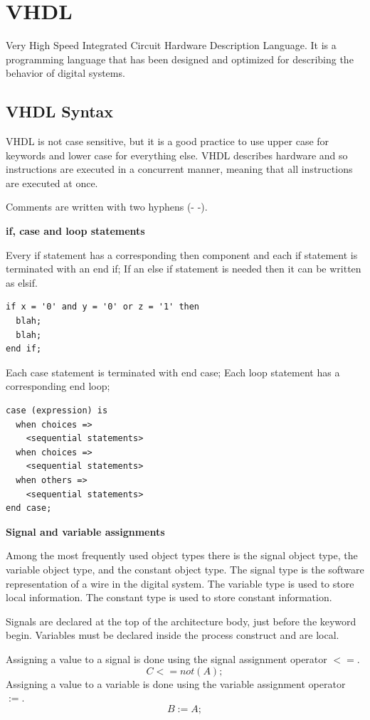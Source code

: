 \section{VHDL}
Very High Speed Integrated Circuit Hardware Description Language.
It is a programming language that has been designed and optimized for describing
the behavior of digital systems.

\subsection{VHDL Syntax}

VHDL is not case sensitive, but it is a good practice to use upper case for keywords and lower case for everything else.
VHDL describes hardware and so instructions are executed in a concurrent manner, meaning that all instructions are executed at once.


Comments are written with two hyphens (- -).


\textbf{if, case and loop statements}

Every if statement has a corresponding then component and each if statement is terminated with an end if;
If an else if statement is needed then it can be written as elsif.
\begin{verbatim}
if x = '0' and y = '0' or z = '1' then
  blah;
  blah;
end if;
\end{verbatim}

Each case statement is terminated with end case; Each loop statement has a corresponding end loop;

\begin{verbatim}
case (expression) is
  when choices =>
    <sequential statements>
  when choices =>
    <sequential statements>
  when others =>
    <sequential statements>
end case;
\end{verbatim}


\textbf{Signal and variable assignments}

Among the most frequently used object types there is the signal object type, the variable object type, and the constant object type.
The signal type is the software representation of a wire in the digital system.
The variable type is used to store local information.
The constant type is used to store constant information.

Signals are declared at the top of the architecture body, just before the keyword begin.
Variables must be declared inside the process construct and are local.

Assigning a value to a signal is done using the signal assignment operator $<=$.
$$C <= not(A);$$
Assigning a value to a variable is done using the variable assignment operator $:=$.
$$ B := A;$$

